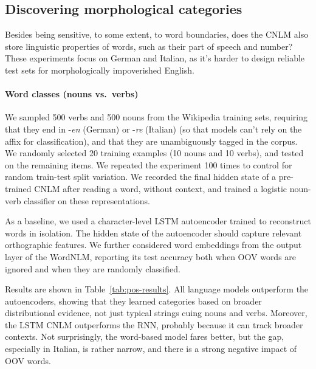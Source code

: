 \subsection{Discovering morphological categories}
\label{sec:categories}

Besides being sensitive, to some extent, to word boundaries, does
the CNLM also store linguistic properties of words, such as their part
of speech and number? These experiments focus on German and
Italian, as it's harder to design reliable test sets for
morphologically impoverished English.

\paragraph{Word classes (nouns vs.~verbs)}

We sampled 500 verbs and 500 nouns from the Wikipedia training sets,
requiring that they end in -\emph{en} (German) or -\emph{re} (Italian)
(so that models can't rely on the affix for classification), and that
they are unambiguously tagged in the corpus. %
We randomly selected 20 training
examples (10 nouns and 10 verbs), and tested on the
remaining items.  We repeated the experiment 100 times to control
for random train-test split variation. We recorded the final
hidden state of a pre-trained CNLM after reading a word, without
context, and trained a logistic noun-verb classifier on these
representations.

As a baseline, we used a character-level LSTM autoencoder trained to
reconstruct words in isolation.  The hidden state of the autoencoder
should capture relevant orthographic features.  We further considered
word embeddings from the output layer of the WordNLM, reporting its test accuracy both when OOV words are ignored and when they are randomly classified.

Results are shown in Table~\ref{tab:pos-results}.  All language models
outperform the autoencoders, showing that they learned categories
based on broader distributional evidence, not just typical strings
cuing nouns and verbs. Moreover, the LSTM CNLM outperforms the RNN,
probably because it can track broader contexts. Not surprisingly, the
word-based model fares better, but the gap, especially in Italian, is
rather narrow, and there is a strong negative impact of OOV words. %

